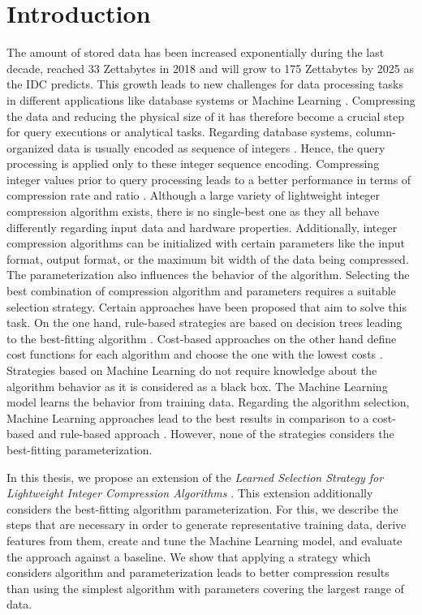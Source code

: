 \chapter{Introduction}
The amount of stored data has been increased exponentially during the last decade, reached 33 Zettabytes in 2018 and will grow to 175 Zettabytes by 2025 as the IDC \cite{Reinsel2018} predicts. This growth leads to new challenges for data processing tasks in different applications like database systems \cite{Abadi2006} or Machine Learning \cite{Elgohary2016}. Compressing the data and reducing the physical size of it has therefore become a crucial step for query executions or analytical tasks. Regarding database systems, column-organized data is usually encoded as sequence of integers \cite{Stonebraker}. Hence, the query processing is applied only to these integer sequence encoding. Compressing integer values prior to query processing leads to a better performance in terms of compression rate and ratio \cite{Woltmann2021}. Although a large variety of lightweight integer compression algorithm exists, there is no single-best one \cite{Damme2017, Damme2019} as they all behave differently regarding input data and hardware properties. Additionally, integer compression algorithms can be initialized with certain parameters like the input format, output format, or the maximum bit width of the data being compressed. The parameterization also influences the behavior of the algorithm. Selecting the best combination of compression algorithm and parameters requires a suitable selection strategy. Certain approaches have been proposed that aim to solve this task. On the one hand, rule-based strategies are based on decision trees leading to the best-fitting algorithm \cite{Abadi2006}. Cost-based approaches on the other hand define cost functions for each algorithm and choose the one with the lowest costs \cite{Damme2019}.
Strategies based on Machine Learning do not require knowledge about the algorithm behavior as it is considered as a black box. The Machine Learning model learns the behavior from training data. Regarding the algorithm selection, Machine Learning approaches lead to the best results in comparison to a cost-based and rule-based approach \cite{Woltmann2021}.
However, none of the strategies considers the best-fitting parameterization. 

In this thesis, we propose an extension of the \emph{Learned Selection Strategy for Lightweight Integer Compression Algorithms} \cite{Woltmann2021}. This extension additionally considers the best-fitting algorithm parameterization. For this, we describe the steps that are necessary in order to generate representative training data, derive features from them, create and tune the Machine Learning model, and evaluate the approach against a baseline. We show that applying a strategy which considers algorithm and parameterization leads to better compression results than using the simplest algorithm with parameters covering the largest range of data.

